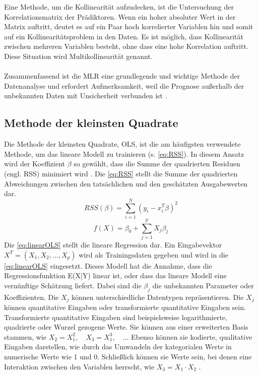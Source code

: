 Eine Methode, um die Kollinearität aufzudecken, ist die Untersuchung der Korrelationsmatrix der Prädiktoren. Wenn ein hoher absoluter Wert in der Matrix auftritt, deutet es auf ein Paar hoch korrelierter Variablen hin und somit auf ein Kollinearitätsproblem in den Daten. Es ist möglich, dass Kollinearität zwischen mehreren Variablen besteht, ohne dass eine hohe Korrelation auftritt. Diese Situation wird Multikollinearität genannt.\\\\
Zusammenfassend ist die \ac{MLR} eine grundlegende und wichtige Methode der Datenanalyse und erfordert Aufmerksamkeit, weil die Prognose außerhalb der unbekannten Daten mit Unsicherheit verbunden ist \cite{akinkunmi2018data}. 

\subsection{Methode der kleinsten Quadrate}
\label{methodederkleinstenquadrate}
Die Methode der kleinsten Quadrate, \ac{OLS}, ist die am häufigsten verwendete Methode, um das lineare Modell zu trainieren (s. \autoref{eq:RSS}). In diesem Ansatz wird der Koeffizient $\beta$ so gewählt, dass die Summe der quadrierten Residuen (engl. \ac{RSS}) minimiert wird \cite{hastie2009elements}. Die \autoref{eq:RSS} stellt die Summe der quadrierten Abweichungen zwischen den tatsächlichen und den geschätzten Ausgabewerten dar. 
\begin{equation}
RSS(\beta) = \sum_{i=1}^{N} (y_i - x_i^T \beta)^2 
\label{eq:RSS}
\end{equation}
\begin{equation}
f(X) = \beta_0 + \sum_{j=1}^{p} X_j \beta_j 
\label{eq:linearOLS}
\end{equation}
Die \autoref{eq:linearOLS} stellt die lineare Regression dar. Ein Eingabevektor \( X^T = (X_1, X_2, \ldots, X_p) \) wird als Trainingsdaten gegeben und wird in die \autoref{eq:linearOLS} eingesetzt. Dieses Modell hat die Annahme, dass die Regressionsfunktion E(X|Y) linear ist, oder dass das lineare Modell eine vernünftige Schätzung liefert. Dabei sind die $\beta_j$ die unbekannten Parameter oder Koeffizienten. Die \( X_j \) können unterschiedliche Datentypen repräsentieren. Die \( X_j \) können quantitative Eingaben oder transformierte quantitative Eingaben sein. Transformierte quantitative Eingaben sind beispielsweise logarithmierte, quadrierte oder Wurzel gezogene Werte. Sie können aus einer erweiterten Basis stammen, wie \( X_2 = X_1^2, \quad X_3 = X_1^3,\quad \ldots \) Ebenso können sie kodierte, qualitative Eingaben darstellen, wie durch das Umwandeln der kategorialen Werte in numerische Werte wie 1 und 0. Schließlich können sie Werte sein, bei denen eine Interaktion zwischen den Variablen herrscht, wie \( X_3 = X_1 \cdot X_2 \) \cite{hastie2009elements}.\\\\
